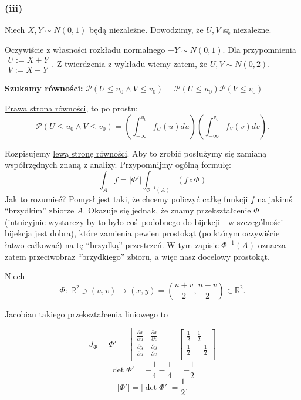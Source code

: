 \subsubsection*{(iii)}
Niech \(X,Y \sim N(0, 1)\) będą niezależne. Dowodzimy, że \(U, V\) są niezależne.

Oczywiście z własności rozkładu normalnego \(-Y \sim N(0, 1)\). Dla przypomnienia \(\substack{U := X+Y \\ V := X - Y}\). Z twierdzenia z wykładu wiemy zatem, że \(U, V \sim N(0, 2)\).

\textbf{Szukamy równości: } \(\mathcal{P}(U \le u_0 \land V \le v_0) = \mathcal{P}(U \le u_0)\mathcal{P}(V \le v_0)\)

\underline{Prawa strona równości}, to po prostu:
\[
	\mathcal{P}(U \le u_0 \land V \le v_0) = \left(\int_{-\infty}^{u_0} f_U(u) du\right)\left(\int_{-\infty}^{v_0} f_V(v) dv\right).
\]

Rozpisujemy \underline{lewą stronę równości}. Aby to zrobić posłużymy się zamianą współrzędnych znaną z analizy. Przypomnijmy ogólną formułę:
\[
	\int_A f = |\Phi'| \int_{\Phi^{-1}(A)} (f \circ \Phi)
\]
Jak to rozumieć? Pomysł jest taki, że chcemy policzyć całkę funkcji \(f\) na jakimś ``brzydkim'' zbiorze \(A\). Okazuje się jednak, że znamy przekształcenie \(\Phi\) (intuicyjnie wystarczy by to było coś podobnego do bijekcji - w szczególności bijekcja jest dobra), które zamienia pewien prostokąt (po którym oczywiście łatwo całkować) na tę ``brzydką'' przestrzeń. W tym zapisie \(\Phi^{-1}(A)\) oznacza zatem przeciwobraz ``brzydkiego'' zbioru, a więc nasz docelowy prostokąt.

Niech
\[
	\Phi: \; \mathbb{R}^2 \ni (u, v) \to (x, y) = \left(\frac{u+v}{2}, \frac{u-v}{2}\right) \in \mathbb{R}^2.
\]

Jacobian takiego przekształcenia liniowego to

\[
	J_{\Phi} = \Phi' =
	\begin{bmatrix}
		\frac{\partial x}{\partial u} &
		\frac{\partial x}{\partial v}   \\[4pt]
		\frac{\partial y}{\partial u} &
		\frac{\partial y}{\partial v}   \\[4pt]
	\end{bmatrix} =
	\begin{bmatrix}
		\frac{1}{2} &
		\frac{1}{2}   \\[4pt]
		\frac{1}{2} &
		-\frac{1}{2}  \\[4pt]
	\end{bmatrix}
\]
\[
	\det \Phi' = -\frac{1}{4} -\frac{1}{4} = -\frac{1}{2}
\]
\[
	|\Phi'| = |\det \Phi'| = \frac{1}{2}.
\]

